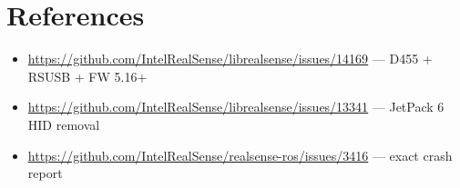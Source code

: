 \documentclass[11pt]{article}
\begin{document}
\section*{References}

\begin{itemize}[nosep]
    \item \url{https://github.com/IntelRealSense/librealsense/issues/14169} --- D455 + RSUSB + FW 5.16+
    \item \url{https://github.com/IntelRealSense/librealsense/issues/13341} --- JetPack 6 HID removal
    \item \url{https://github.com/IntelRealSense/realsense-ros/issues/3416} --- exact crash report
\end{itemize}
\end{document}
